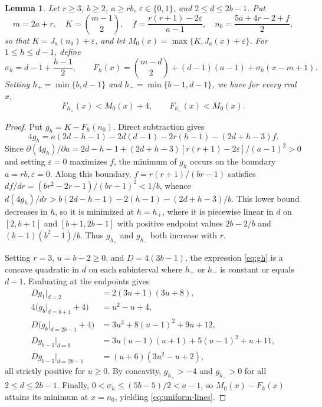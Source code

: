 \documentclass[10pt]{article}
\theoremstyle{compactplain}
\newtheorem{lemma}[theorem]{Lemma}
\theoremstyle{remark}\newtheorem{remark}[theorem]{Remark}
\begin{document}
\begin{lemma}\label{lem:uniform-lines}
Let $r\ge3$, $b\ge2$, $a\ge rb$, $\varepsilon\in\{0,1\}$, and
$2\le d\le2b-1$. Put
\[
 m=2a+r,\quad K=\binom{m-1}{2},\quad
 f=\frac{r(r+1)-2\varepsilon}{a-1},\quad
 n_0=\frac{5a+4r-2+f}{2},
\]
so that $K=J_a(n_0)+\varepsilon$, and let
$M_0(x)=\max\{K,J_a(x)+\varepsilon\}$. For $1\le h\le d-1$, define
\[
 \sigma_h=d-1+\frac{h-1}{2},\qquad
 F_h(x)=\binom{m-d}{2}+(d-1)(a-1)+\sigma_h(x-m+1).
\]
Setting $h_+=\min\{b,d-1\}$ and $h_-=\min\{b-1,d-1\}$, we have for every
real $x$,
\begin{equation}\label{eq:uniform-lines}
 F_{h_+}(x)<M_0(x)+4,\qquad F_{h_-}(x)<M_0(x).
\end{equation}
\end{lemma}
\begin{proof}
Put $g_h=K-F_h(n_0)$. Direct subtraction gives
\begin{equation}\label{eq:gh}
 4g_h=a(2d-h-1)-2d(d-1)-2r(h-1)-(2d+h-3)f.
\end{equation}
Since $\partial(4g_h)/\partial a=2d-h-1+(2d+h-3)[r(r+1)-2\varepsilon]/(a-1)^2>0$
and setting $\varepsilon=0$ maximizes $f$, the minimum of $g_h$ occurs
on the boundary $a=rb,\varepsilon=0$. Along this boundary,
$f=r(r+1)/(br-1)$ satisfies $df/dr=(br^2-2r-1)/(br-1)^2<1/b$, whence
$d(4g_h)/dr>b(2d-h-1)-2(h-1)-(2d+h-3)/b$. This lower bound decreases in
$h$, so it is minimized at $h=h_+$, where it is piecewise linear in $d$
on $[2,b+1]$ and $[b+1,2b-1]$ with positive endpoint values $2b-2/b$ and
$(b-1)(b^2-1)/b$. Thus $g_{h_+}$ and $g_{h_-}$ both increase with $r$.

Setting $r=3$, $u=b-2\ge0$, and $D=4(3b-1)$, the expression
\eqref{eq:gh} is a concave quadratic in $d$ on each subinterval where
$h_+$ or $h_-$ is constant or equals $d-1$. Evaluating at the endpoints
gives
\[
\begin{aligned}
 Dg_1\big|_{d=2} &= 2(3u+1)(3u+8),\\
 4\bigl(g_b\big|_{d=b+1}+4\bigr) &= u^2-u+4,\\
 D\bigl(g_b\big|_{d=2b-1}+4\bigr) &= 3u^3+8(u-1)^2+9u+12,\\
 Dg_{b-1}\big|_{d=b} &= 3u(u-1)(u+1)+5(u-1)^2+u+11,\\
 Dg_{b-1}\big|_{d=2b-1} &= (u+6)(3u^2-u+2),
\end{aligned}
\]
all strictly positive for $u\ge0$. By concavity, $g_{h_+}>-4$ and
$g_{h_-}>0$ for all $2\le d\le2b-1$. Finally,
$0<\sigma_h\le(5b-5)/2<a-1$, so $M_0(x)-F_h(x)$ attains its minimum at
$x=n_0$, yielding \eqref{eq:uniform-lines}.
\end{proof}
\end{document}
